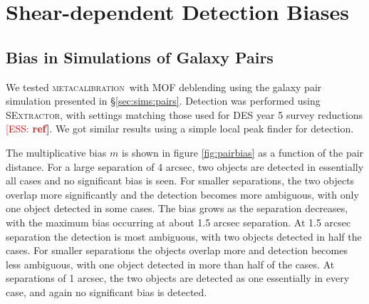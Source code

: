 \documentclass[fleqn,useAMS,usenatbib]{mnras}
\newcommand{\ess}[1]{\textcolor{red}{[ESS: \bf #1]}}
\newcommand{\mcal}{\textsc{metacalibration}}
\newcommand{\sx}{\textsc{SExtractor}}
\begin{document}
\section{Shear-dependent Detection Biases}

\subsection{Bias in Simulations of Galaxy Pairs}

We tested \mcal\ with MOF deblending using the galaxy pair simulation presented
in \S \ref{sec:sims:pairs}.  Detection was performed using \sx, with settings
matching those used for DES year 5 survey reductions \ess{ref}.  We got similar
results using a simple local peak finder for detection.

The multiplicative bias $m$ is shown in figure \ref{fig:pairbias} as a function
of the pair distance.  For a large separation of 4 arcsec, two objects are
detected in essentially all cases and no significant bias is seen.  For smaller
separations, the two objects overlap more significantly and the detection
becomes more ambiguous, with only one object detected in some cases.  The bias
grows as the separation decreases, with the maximum bias occurring at about 1.5
arcsec separation.  At 1.5 arcsec separation the detection is most ambiguous,
with two objects detected in half the cases.  For smaller separations the
objects overlap more and detection becomes less ambiguous, with one object
detected in more than half of the cases.  At separations of 1 arcsec, the two
objects are detected as one essentially in every case, and again no significant
bias is detected.
\end{document}
